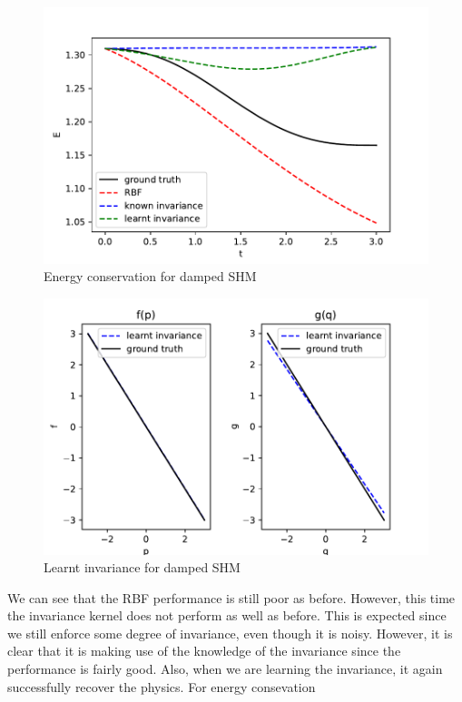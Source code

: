 \documentclass{statsmsc}
\begin{document}
\begin{figure}[H] 
  \includegraphics[width=\linewidth]{../codes/figures/damped_shm_energy.pdf}
  \centering
  \caption{Energy conservation for damped SHM}
  \label{fig:damped_shm_energy}
\end{figure}


\begin{figure}[H] 
  \includegraphics[width=\linewidth]{../codes/figures/damped_shm_learnt.pdf}
  \centering
  \caption{Learnt invariance for damped SHM}
  \label{fig:damped_shm_learnt}
\end{figure}

We can see that the RBF performance is still poor as before.
However, this time the invariance kernel does not perform as well as before. 
This is expected since we still enforce some degree of invariance, even though it is noisy. 
However, it is clear that it is making use of the knowledge of the invariance since the performance is fairly good.
Also, when we are learning the invariance, it again successfully recover the physics.
For energy consevation
\end{document}
